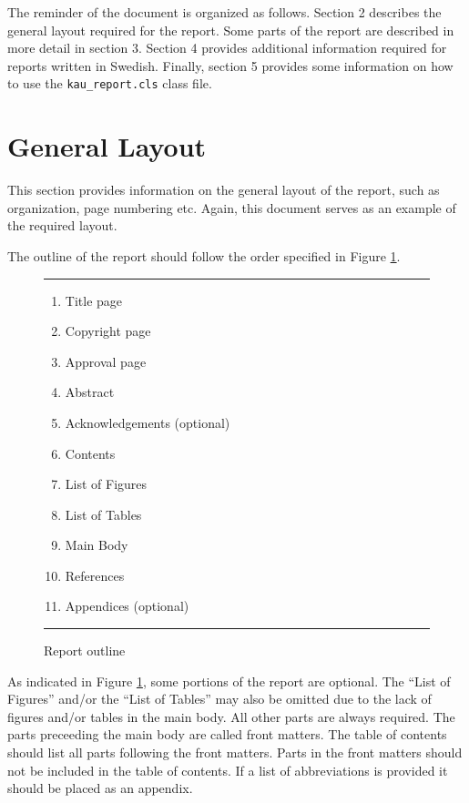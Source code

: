 \documentclass[12pt,twoside]{kau_report}
\begin{document}
The reminder of the document is organized as follows. Section 2
describes the general layout required for the report. Some parts of
the report are described in more detail in section 3. Section 4
provides additional information required for
reports written in Swedish. Finally, section 5 provides some
information on how to use the {\tt kau\_report.cls} class file.

\section{General Layout}
This section provides information on the general layout of the report,
such as organization, page numbering etc. Again, this document serves
as an example of the required layout.

The outline of the report should follow the order specified in Figure \ref{outline}.
\begin{figure}[ht]
\begin{center}
\begin{minipage}{8cm}
\hrule
\begin{enumerate}
\item Title page
\item Copyright page
\item Approval page 
\item Abstract 
\item Acknowledgements (optional)
\item Contents 
\item List of Figures 
\item List of Tables 
\item Main Body 
\item References 
\item Appendices (optional)
\end{enumerate}
\hrule
\end{minipage}
\end{center}
\caption{Report outline}
\label{outline}
\end{figure}
As indicated in Figure \ref{outline}, some portions of the report are
optional. The ``List of Figures'' and/or the ``List of Tables'' may
also be omitted due to the lack of figures and/or tables in the main
body. All other parts are always required. The parts preceeding the
main body are called front matters. The table of contents
should list all parts following the front matters. Parts in the front
matters should not be included in the table of contents. If a list of
abbreviations is provided it should be placed as an appendix.
\end{document}
